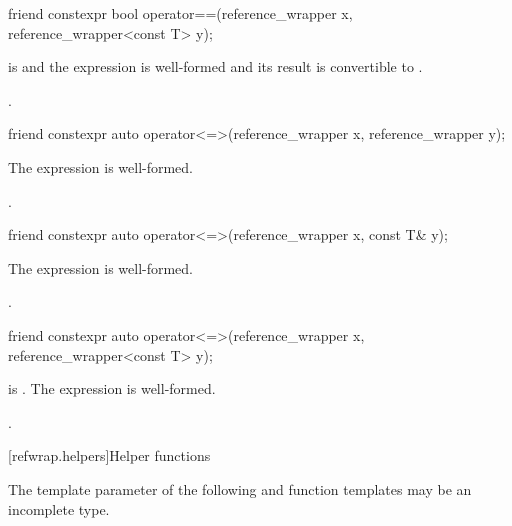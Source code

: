 \begin{itemdecl}
friend constexpr bool operator==(reference_wrapper x, reference_wrapper<const T> y);
\end{itemdecl}

\begin{itemdescr}
\pnum
\constraints
{} is  and
the expression  is well-formed and
its result is convertible to .

\pnum
\returns
{}.
\end{itemdescr}

\begin{itemdecl}
friend constexpr auto operator<=>(reference_wrapper x, reference_wrapper y);
\end{itemdecl}

\begin{itemdescr}
\pnum
\constraints
The expression 
is well-formed.

\pnum
\returns
{}.
\end{itemdescr}

\begin{itemdecl}
friend constexpr auto operator<=>(reference_wrapper x, const T& y);
\end{itemdecl}

\begin{itemdescr}
\pnum
\constraints
The expression 
is well-formed.

\pnum
\returns
{}.
\end{itemdescr}

\begin{itemdecl}
friend constexpr auto operator<=>(reference_wrapper x, reference_wrapper<const T> y);
\end{itemdecl}

\begin{itemdescr}
\pnum
\constraints
{} is .
The expression 
is well-formed.

\pnum
\returns
{}.
\end{itemdescr}

[refwrap.helpers]{Helper functions}

\pnum
The template parameter  of
the following  and  function templates
may be an incomplete type.

